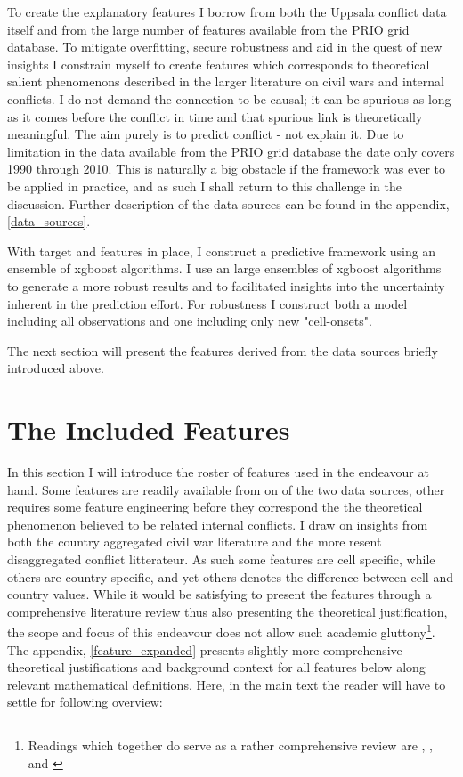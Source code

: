 \documentclass[a4paper]{article}
\begin{document}
To create the explanatory features I borrow from both the Uppsala conflict data itself and from the large number of features available from the PRIO grid database. To mitigate overfitting, secure robustness and aid in the quest of new insights I constrain myself to create features which corresponds to theoretical salient phenomenons described in the larger literature on civil wars and internal conflicts. I do not demand the connection to be causal; it can be spurious as long as it comes before the conflict in time and that spurious link is theoretically meaningful. The aim purely is to predict conflict - not explain it. Due to limitation in the data available from the PRIO grid database the date only covers 1990 through 2010. This is naturally a big obstacle if the framework was ever to be applied in practice, and as such I shall return to this challenge in the discussion. Further description of the data sources can be found in the appendix, \autoref{data_sources}.\par

With target and features in place, I construct a predictive framework using an ensemble of xgboost algorithms. I use an large ensembles of xgboost algorithms to generate a more robust results and to facilitated insights into the uncertainty inherent in the prediction effort. For robustness I construct both a model including all observations and one including only new "cell-onsets".\par

The next section will present the features derived from the data sources briefly introduced above.\par

\section{The Included Features}

In this section I will introduce the roster of features used in the endeavour at hand. Some features are readily available from on of the two data sources, other requires some feature engineering before they correspond the the theoretical phenomenon believed to be related internal conflicts. I draw on insights from both the country aggregated civil war literature and the more resent disaggregated conflict litterateur. As such some features are cell specific, while others are country specific, and yet others denotes the difference between cell and country values. While it would be satisfying to present the features through a comprehensive literature review thus also presenting the theoretical justification, the scope and focus of this endeavour does not allow such academic gluttony\footnote{Readings which together do serve as a rather comprehensive review are \cite{Hegre_Sambanis_2006}, \cite{Kalyvas_2007}, \cite{Cederman_Gleditsch_2009} and \cite{Blattman_Miguel_2010}}. The appendix, \autoref{feature_expanded} presents slightly more comprehensive theoretical justifications and background context for all features below along relevant mathematical definitions. Here, in the main text the reader will have to settle for following overview:\par
\end{document}
